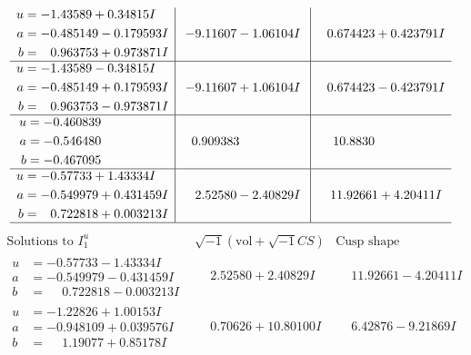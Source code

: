 \documentclass[1p]{elsarticle_modified}
\theoremstyle{definition}
\newcommand{\I}{\sqrt{-1}}
\begin{document}
$$\begin{array}{c|c|c}
\begin{aligned}
u &= -1.43589 + 0.34815 I \\
a &= -0.485149 - 0.179593 I \\
b &= \phantom{-}0.963753 + 0.973871 I\end{aligned}
 & -9.11607 - 1.06104 I & \phantom{-}0.674423 + 0.423791 I \\ \hline\begin{aligned}
u &= -1.43589 - 0.34815 I \\
a &= -0.485149 + 0.179593 I \\
b &= \phantom{-}0.963753 - 0.973871 I\end{aligned}
 & -9.11607 + 1.06104 I & \phantom{-}0.674423 - 0.423791 I \\ \hline\begin{aligned}
u &= -0.460839\phantom{ +0.000000I} \\
a &= -0.546480\phantom{ +0.000000I} \\
b &= -0.467095\phantom{ +0.000000I}\end{aligned}
 & \phantom{-}0.909383\phantom{ +0.000000I} & \phantom{-}10.8830\phantom{ +0.000000I} \\ \hline\begin{aligned}
u &= -0.57733 + 1.43334 I \\
a &= -0.549979 + 0.431459 I \\
b &= \phantom{-}0.722818 + 0.003213 I\end{aligned}
 & \phantom{-}2.52580 - 2.40829 I & \phantom{-}11.92661 + 4.20411 I\\
 \hline 
 \end{array}$$\newpage$$\begin{array}{c|c|c}  
\text{Solutions to }I^u_{1}& \I (\text{vol} + \sqrt{-1}CS) & \text{Cusp shape}\\
 \hline 
\begin{aligned}
u &= -0.57733 - 1.43334 I \\
a &= -0.549979 - 0.431459 I \\
b &= \phantom{-}0.722818 - 0.003213 I\end{aligned}
 & \phantom{-}2.52580 + 2.40829 I & \phantom{-}11.92661 - 4.20411 I \\ \hline\begin{aligned}
u &= -1.22826 + 1.00153 I \\
a &= -0.948109 + 0.039576 I \\
b &= \phantom{-}1.19077 + 0.85178 I\end{aligned}
 & \phantom{-}0.70626 + 10.80100 I & \phantom{-}6.42876 - 9.21869 I \\ \hline\begin{aligned}

\end{aligned}
\end{array}$$
\end{document}
